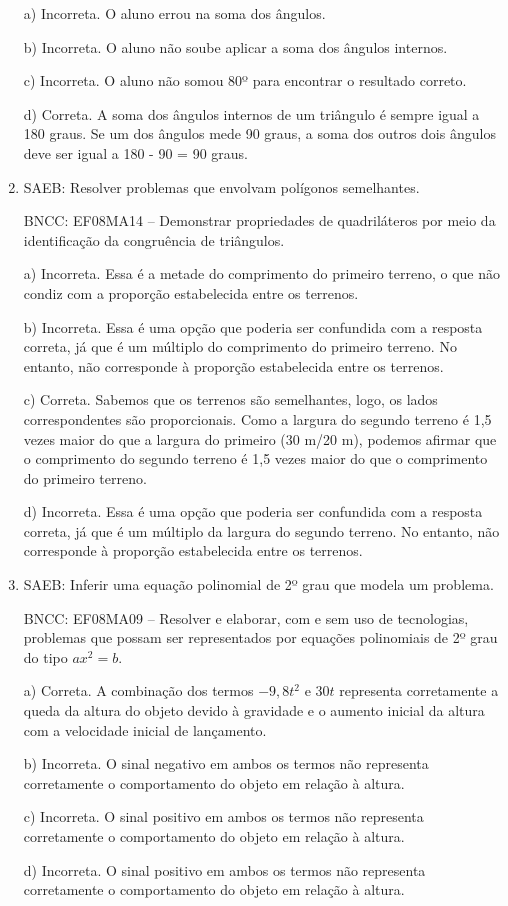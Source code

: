 \begin{enumerate}
a) Incorreta. O aluno errou na soma dos ângulos.

b) Incorreta. O aluno não soube aplicar a soma dos ângulos
internos.

c) Incorreta. O aluno não somou 80º para encontrar o resultado
correto.

d) Correta. A soma dos ângulos internos de um triângulo é sempre
igual a 180 graus. Se um dos ângulos mede 90 graus, a soma dos outros
dois ângulos deve ser igual a 180 - 90 = 90 graus.
\item SAEB: Resolver problemas que envolvam polígonos semelhantes.

BNCC: EF08MA14 -- Demonstrar propriedades de quadriláteros por meio da
identificação da congruência de triângulos.

a) Incorreta. Essa é a metade do comprimento do primeiro terreno, o
que não condiz com a proporção estabelecida entre os terrenos.

b) Incorreta. Essa é uma opção que poderia ser confundida com a
resposta correta, já que é um múltiplo do comprimento do primeiro
terreno. No entanto, não corresponde à proporção estabelecida entre os
terrenos.

c) Correta. Sabemos que os terrenos são semelhantes, logo, os lados
correspondentes são proporcionais. Como a largura do segundo terreno é
1,5 vezes maior do que a largura do primeiro (30 m/20 m), podemos
afirmar que o comprimento do segundo terreno é 1,5 vezes maior do que o
comprimento do primeiro terreno.

d) Incorreta. Essa é uma opção que poderia ser confundida com a
resposta correta, já que é um múltiplo da largura do segundo terreno. No
entanto, não corresponde à proporção estabelecida entre os terrenos.
\item SAEB: Inferir uma equação polinomial de 2º grau que modela um problema.

BNCC: EF08MA09 -- Resolver e elaborar, com e sem uso de tecnologias,
problemas que possam ser representados por equações polinomiais de 2º
grau do tipo $ax^2 = b$.

a) Correta. A combinação dos termos $-9,8t^2$ e $30t$ representa
corretamente a queda da altura do objeto devido à gravidade e o aumento
inicial da altura com a velocidade inicial de lançamento.

b) Incorreta. O sinal negativo em ambos os termos não representa
corretamente o comportamento do objeto em relação à altura.

c) Incorreta. O sinal positivo em ambos os termos não representa
corretamente o comportamento do objeto em relação à altura.

d) Incorreta. O sinal positivo em ambos os termos não representa
corretamente o comportamento do objeto em relação à altura.
\end{enumerate}


